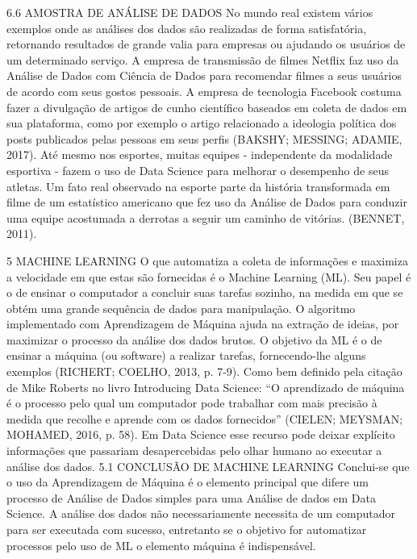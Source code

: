 6.6 AMOSTRA DE ANÁLISE DE DADOS
No mundo real existem vários exemplos onde as análises dos dados são realizadas de
forma satisfatória, retornando resultados de grande valia para empresas ou ajudando os
usuários de um determinado serviço.
A empresa de transmissão de filmes Netflix faz uso da Análise de Dados com Ciência de
Dados para recomendar filmes a seus usuários de acordo com seus gostos pessoais.
A empresa de tecnologia Facebook costuma fazer a divulgação de artigos de cunho
científico baseados em coleta de dados em sua plataforma, como por exemplo o artigo
relacionado a ideologia política dos posts publicados pelas pessoas em seus perfis
(BAKSHY; MESSING; ADAMIE, 2017). Até mesmo nos esportes, muitas equipes -
independente da modalidade esportiva - fazem o uso de Data Science para melhorar o
desempenho de seus atletas. Um fato real observado na esporte parte da história
transformada em filme de um estatístico americano que fez uso da Análise de Dados para
conduzir uma equipe acostumada a derrotas a seguir um caminho de vitórias. (BENNET,
2011).

5 MACHINE LEARNING
O que automatiza a coleta de informações e maximiza a velocidade em que estas são
fornecidas é o Machine Learning (ML). Seu papel é o de ensinar o computador a concluir
suas tarefas sozinho, na medida em que se obtém uma grande sequência de dados para
manipulação. O algoritmo implementado com Aprendizagem de Máquina ajuda na
extração de ideias, por maximizar o processo da análise dos dados brutos. O objetivo da
ML é o de ensinar a máquina (ou software) a realizar tarefas, fornecendo-lhe alguns
exemplos (RICHERT; COELHO, 2013, p. 7-9).
Como bem definido pela citação de Mike Roberts no livro Introducing Data Science: “O
aprendizado de máquina é o processo pelo qual um computador pode trabalhar com mais
precisão à medida que recolhe e aprende com os dados fornecidos” (CIELEN;
MEYSMAN; MOHAMED, 2016, p. 58). Em Data Science esse recurso pode deixar
explícito informações que passariam desapercebidas pelo olhar humano ao executar a
análise dos dados.
5.1 CONCLUSÃO DE MACHINE LEARNING
Conclui-se que o uso da Aprendizagem de Máquina é o elemento principal que difere um
processo de Análise de Dados simples para uma Análise de dados em Data Science. A
análise dos dados não necessariamente necessita de um computador para ser executada
com sucesso, entretanto se o objetivo for automatizar processos pelo uso de ML o
elemento máquina é indispensável.



